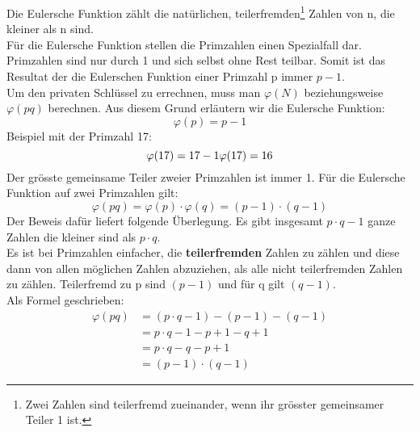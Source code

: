 Die Eulersche Funktion zählt die natürlichen, teilerfremden\footnote{Zwei Zahlen sind teilerfremd zueinander, wenn ihr grösster gemeinsamer Teiler 1 ist.}  Zahlen von n, die kleiner als n sind.\\
Für die Eulersche Funktion stellen die Primzahlen einen Spezialfall dar.
Primzahlen sind nur durch 1 und sich selbst ohne Rest teilbar. Somit ist das Resultat der die Eulerschen Funktion einer Primzahl p immer $p - 1$.\\
Um den privaten Schlüssel zu errechnen, muss man $\varphi(N)$ beziehungsweise $\varphi(pq)$ berechnen. Aus diesem Grund erläutern wir die Eulersche Funktion:
%
\begin{equation*}
  \varphi(p) = p - 1
\end{equation*}
%
Beispiel mit der Primzahl 17:
\begin{equation*}
	\varphi(17) = 17 - 1 \\
	\varphi(17) = 16 \\
\end{equation*}
Der grösste gemeinsame Teiler zweier Primzahlen ist immer 1.
Für die Eulersche Funktion auf zwei Primzahlen gilt:
\begin{equation}
  \varphi(pq) = \varphi(p) \cdot \varphi(q) = (p - 1) \cdot (q - 1)
  \label{eqn:eulersche_func}
\end{equation}
Der Beweis dafür liefert folgende Überlegung. Es gibt insgesamt $p \cdot q -1$ ganze Zahlen die kleiner sind als $p \cdot q$.\\
Es ist bei Primzahlen einfacher, die \textbf{teilerfremden} Zahlen zu zählen und diese dann von allen möglichen Zahlen abzuziehen, als alle nicht teilerfremden Zahlen zu zählen. Teilerfremd zu p sind $(p - 1) $ und für q gilt $ (q - 1) $. \cite{kryptologie}\\
Als Formel geschrieben:
%
\begin{equation*}
  \begin{split}
    \varphi(pq) & = (p \cdot q - 1) - (p - 1) - (q - 1)  \\
     & = p \cdot q - 1 - p + 1 - q + 1  \\
     & = p \cdot q - q - p + 1  \\
     & = (p -1) \cdot (q - 1)
    \label{eqn:herleitung_eulersche_func}
  \end{split}
\end{equation*}
